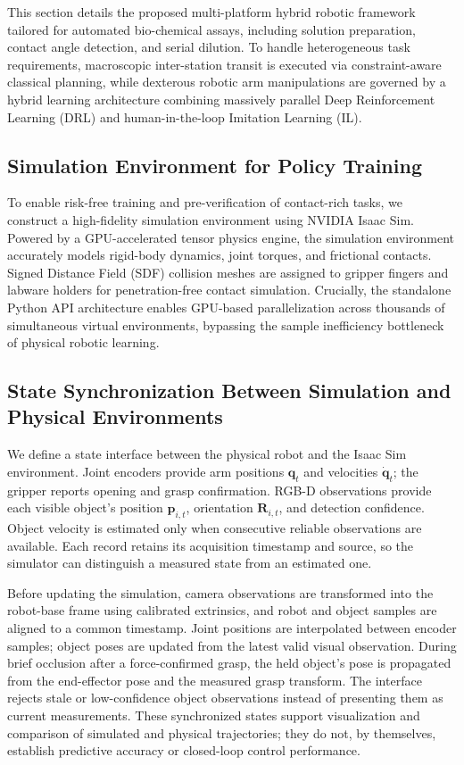 \documentclass[journal,twocolumn]{IEEEtran}
\begin{document}
This section details the proposed multi-platform hybrid robotic framework tailored for automated bio-chemical assays, including solution preparation, contact angle detection, and serial dilution. To handle heterogeneous task requirements, macroscopic inter-station transit is executed via constraint-aware classical planning, while dexterous robotic arm manipulations are governed by a hybrid learning architecture combining massively parallel Deep Reinforcement Learning (DRL) and human-in-the-loop Imitation Learning (IL).

\subsection{Simulation Environment for Policy Training}
\label{subsec:simulation_training}

To enable risk-free training and pre-verification of contact-rich tasks, we construct a high-fidelity simulation environment using NVIDIA Isaac Sim. Powered by a GPU-accelerated tensor physics engine, the simulation environment accurately models rigid-body dynamics, joint torques, and frictional contacts. Signed Distance Field (SDF) collision meshes are assigned to gripper fingers and labware holders for penetration-free contact simulation. Crucially, the standalone Python API architecture enables GPU-based parallelization across thousands of simultaneous virtual environments, bypassing the sample inefficiency bottleneck of physical robotic learning.

\subsection{State Synchronization Between Simulation and Physical Environments}
\label{subsec:state_sync}

We define a state interface between the physical robot and the Isaac Sim environment. Joint encoders provide arm positions $\mathbf q_t$ and velocities $\dot{\mathbf q}_t$; the gripper reports opening and grasp confirmation. RGB-D observations provide each visible object's position $\mathbf p_{i,t}$, orientation $\mathbf R_{i,t}$, and detection confidence. Object velocity is estimated only when consecutive reliable observations are available. Each record retains its acquisition timestamp and source, so the simulator can distinguish a measured state from an estimated one.

Before updating the simulation, camera observations are transformed into the robot-base frame using calibrated extrinsics, and robot and object samples are aligned to a common timestamp. Joint positions are interpolated between encoder samples; object poses are updated from the latest valid visual observation. During brief occlusion after a force-confirmed grasp, the held object's pose is propagated from the end-effector pose and the measured grasp transform. The interface rejects stale or low-confidence object observations instead of presenting them as current measurements. These synchronized states support visualization and comparison of simulated and physical trajectories; they do not, by themselves, establish predictive accuracy or closed-loop control performance.
\end{document}
